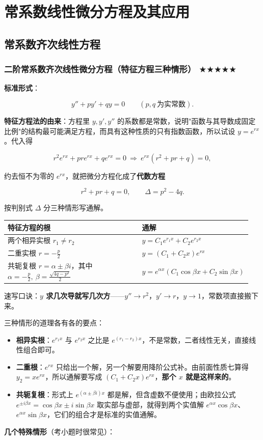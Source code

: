 \documentclass[11pt,openany,UTF8]{ctexbook}
\begin{document}
\section{常系数线性微分方程及其应用}

\subsection{常系数齐次线性方程}

\subsubsection{二阶常系数齐次线性微分方程（特征方程三种情形） $\bigstar$$\bigstar$$\bigstar$$\bigstar$$\bigstar$}

\textbf{标准形式}：

\[y''+py'+qy=0\qquad (p,q\ \text{为实常数}).\]

\textbf{特征方程法的由来}：方程里 $y,y',y''$ 的系数都是常数，说明"函数与其导数成固定比例"的结构最可能满足方程，而具有这种性质的只有指数函数，所以试设 $y=e^{rx}$。代入得

\[r^{2}e^{rx}+pre^{rx}+qe^{rx}=0\ \Longrightarrow\ e^{rx}\left(r^{2}+pr+q\right)=0 ,\]

约去恒不为零的 $e^{rx}$，就把微分方程化成了\textbf{代数方程}

\[r^{2}+pr+q=0,\qquad \Delta=p^{2}-4q .\]

按判别式 $\Delta$ 分三种情形写通解。

\begingroup\small\setlength{\tabcolsep}{4.0pt}
\begin{longtable}{@{}L{0.5550\linewidth}L{0.3906\linewidth}@{}}
\toprule
\textbf{特征方程的根} & \textbf{通解} \\
\midrule
\endhead
两个相异实根 $r_1\ne r_2$ & $y=C_1e^{r_1x}+C_2e^{r_2x}$ \\
二重实根 $r=-\frac p2$ & $y=(C_1+C_2x)e^{rx}$ \\
共轭复根 $r=\alpha\pm\beta i$，其中 $\alpha=-\frac p2,\allowbreak\ \beta=\frac{\sqrt{4q-p^{2}}}{2}$ & $y=e^{\alpha x}\left(C_1\cos\beta x+C_2\sin\beta x\right)$ \\
\bottomrule
\end{longtable}
\endgroup

速写口诀：\textbf{$y$ 求几次导就写几次方}——$y''\to r^{2}$，$y'\to r$，$y\to 1$，常数项直接搬下来。

三种情形的道理各有各的要点：

\begin{itemize}
\item \textbf{相异实根}：$e^{r_1x}$ 与 $e^{r_2x}$ 之比是 $e^{(r_1-r_2)x}$，不是常数，二者线性无关，直接线性组合即可。
\item \textbf{二重根}：$e^{rx}$ 只给出一个解，另一个解要用降阶公式补。由前面性质七算得 $y_2=xe^{rx}$，所以通解要写成 $(C_1+C_2x)e^{rx}$，\textbf{那个 $x$ 就是这样来的}。
\item \textbf{共轭复根}：形式上 $e^{(\alpha\pm\beta i)x}$ 都是解，但含虚数不便使用；由欧拉公式 $e^{\pm i\beta x}=\cos\beta x\pm i\sin\beta x$ 取实部与虚部，就得到两个实值解 $e^{\alpha x}\cos\beta x$、$e^{\alpha x}\sin\beta x$，它们的组合才是标准的实值通解。
\end{itemize}
\textbf{几个特殊情形}（考小题时很常见）：
\end{document}
